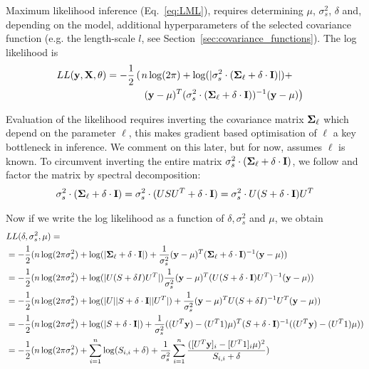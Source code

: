 Maximum likelihood inference (Eq.~\ref{eq:LML}), requires determining $ \mu $, $ \sigma_s^2 $, $ \delta $ and, depending on the model, additional hyperparameters of the selected covariance function (e.g. the length-scale $l$, see Section~\ref{sec:covariance_functions}). The log likelihood is 
\begin{align*}
LL({\bf y}, {\bf X}, \theta) =  -\frac{1}{2} \left( \right. &n \log (2 \pi) + \log (|\sigma_s^2 \cdot (\mbox{\boldmath $\Sigma$}_\ell + \delta \cdot {\bf I}) | ) + & \\
& \left. ({\bf y} - \mu)^T (\sigma_s^2 \cdot (\mbox{\boldmath $\Sigma$}_\ell + \delta \cdot {\bf I} ) )^{-1}  ({\bf y} - \mu) \right) &
\end{align*}

Evaluation of the likelihood requires inverting the covariance matrix \( \mbox{\boldmath $\Sigma$}_\ell \) which depend on the parameter \( \ell \), this makes gradient based optimisation of \( \ell \) a key bottleneck in inference. We comment on this later, but for now, assumes \( \ell \) is known. To circumvent inverting the entire matrix \( \sigma_s^2 \cdot (\mbox{\boldmath $\Sigma$}_\ell + \delta \cdot {\bf I} )  \),  we follow \cite{Lippert2011-fm} and factor the matrix by spectral decomposition:
\begin{align*}
   \sigma_s^2 \cdot (\mbox{\boldmath $\Sigma$}_\ell + \delta \cdot {\bf I} ) =
   \sigma_s^2 \cdot (USU^T + \delta \cdot {\bf I} ) =
   \sigma^2_{s} \cdot U (S + \delta \cdot {\bf I}) U^T
\end{align*}

\begin{sloppypar}
Now if we write the log likelihood as a function of \( \delta, \sigma_s^2 \) and \( \mu \), we obtain
\begin{align*}
& LL(\delta, \sigma_s^2, \mu) = \\
&= -\frac{1}{2}( n \log (2 \pi \sigma_s^2 ) + \log (| \mbox{\boldmath $\Sigma$}_\ell + \delta \cdot {\bf I} |) +  \frac{1}{\sigma_s^2} ({\bf y} - \mu)^T (\mbox{\boldmath $\Sigma$}_\ell + \delta \cdot {\bf I})^{-1} ({\bf y} - \mu)) \\
&= -\frac{1}{2}( n \log (2 \pi \sigma_s^2 ) + \log (|U(S+\delta I)U^T|) \frac{1}{\sigma_s^2} ({\bf y} - \mu)^T (U(S + \delta \cdot {\bf I})U^T)^{-1} ({\bf y} - \mu)) \\
&= -\frac{1}{2}( n \log (2 \pi \sigma_s^2 ) + \log (|U||S + \delta \cdot {\bf I}||U^T|) + \frac{1}{\sigma_s^2} ({\bf y} - \mu)^T U (S + \delta I)^{-1} U^T ({\bf y} - \mu)) \\
&= -\frac{1}{2}( n \log (2 \pi \sigma_s^2 ) + \log (|S + \delta \cdot {\bf I}|) + \frac{1}{\sigma_s^2} ((U^T{\bf y}) - (U^T1)\mu)^T (S + \delta \cdot {\bf I})^{-1} ( (U^T{\bf y}) - (U^T1) \mu)) \\
&= -\frac{1}{2}(n \log (2 \pi \sigma_s^2) + \sum_{i=1}^n \log (S_{i,i} + \delta) + \frac{1}{\sigma_s^2} \sum_{i=1}^n \frac{([U^T{\bf y}]_i - [U^T1]_i \mu)^2}{S_{i,i} + \delta})
\end{align*}
\end{sloppypar}

